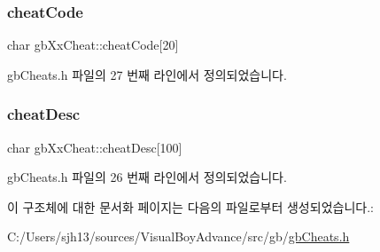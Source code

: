 \subsubsection{\texorpdfstring{cheat\+Code}{cheatCode}}
{\footnotesize\ttfamily char gb\+Xx\+Cheat\+::cheat\+Code\mbox{[}20\mbox{]}}



gb\+Cheats.\+h 파일의 27 번째 라인에서 정의되었습니다.

\mbox{\label{structgb_xx_cheat_a44a4fb7ecbad404cba31ef24bbf9fa72}} 
\subsubsection{\texorpdfstring{cheat\+Desc}{cheatDesc}}
{\footnotesize\ttfamily char gb\+Xx\+Cheat\+::cheat\+Desc\mbox{[}100\mbox{]}}



gb\+Cheats.\+h 파일의 26 번째 라인에서 정의되었습니다.



이 구조체에 대한 문서화 페이지는 다음의 파일로부터 생성되었습니다.\+:\begin{DoxyCompactItemize}
\item 
C\+:/\+Users/sjh13/sources/\+Visual\+Boy\+Advance/src/gb/\mbox{\hyperlink{gb_cheats_8h}{gb\+Cheats.\+h}}\end{DoxyCompactItemize}
